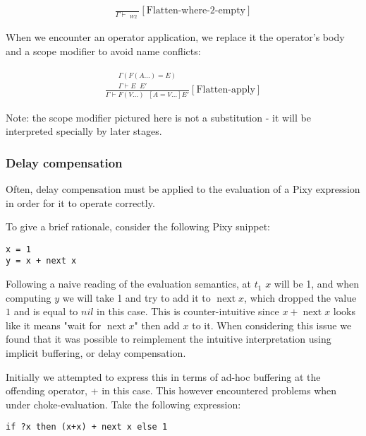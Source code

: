 \documentclass{scrartcl}
\DeclareMathOperator{\nextop}{next}
\DeclareMathOperator{\flattenrel}{\overset{flatten}{\Rightarrow}}
\begin{document}
    \begin{align*}
    \frac{}{
        \Gamma \vdash \flattenrel_{W2}
    }[\text{Flatten-where-2-empty}]
    \end{align*}
    
    When we encounter an operator application, we replace it the operator's body and a scope modifier to avoid name conflicts:
    
    \begin{align*}
    \frac{
        \begin{matrix}
        \Gamma(F(A...) = E) \\
        \Gamma \vdash E \flattenrel E'
        \end{matrix}
    }{
        \Gamma \vdash F(V...) \flattenrel [A=V...]E'
    }[\text{Flatten-apply}]
    \end{align*}
    
    Note: the scope modifier pictured here is not a substitution - it will be interpreted specially by later stages.
    
    \subsubsection{Delay compensation}
    
    Often, delay compensation must be applied to the evaluation of a Pixy expression in order for it to operate correctly.
    
    To give a brief rationale, consider the following Pixy snippet:
    
    \begin{lstlisting}
x = 1
y = x + next x
    \end{lstlisting}
    
    Following a naive reading of the evaluation semantics, at $t_1$ $x$ will be 1, and when computing $y$ we will take 1 and try to add it to $\nextop x$, which dropped the value $1$ and is equal to $nil$ in this case. This is counter-intuitive since $x + \nextop x$ looks like it means "wait for $\nextop x$" then add $x$ to it. When considering this issue we found that it was possible to reimplement the intuitive interpretation using implicit buffering, or delay compensation.
    
    Initially we attempted to express this in terms of ad-hoc buffering at the offending operator, + in this case. This however encountered problems when under choke-evaluation. Take the following expression:
    
    \begin{lstlisting}
if ?x then (x+x) + next x else 1
    \end{lstlisting}
    
\end{document}
